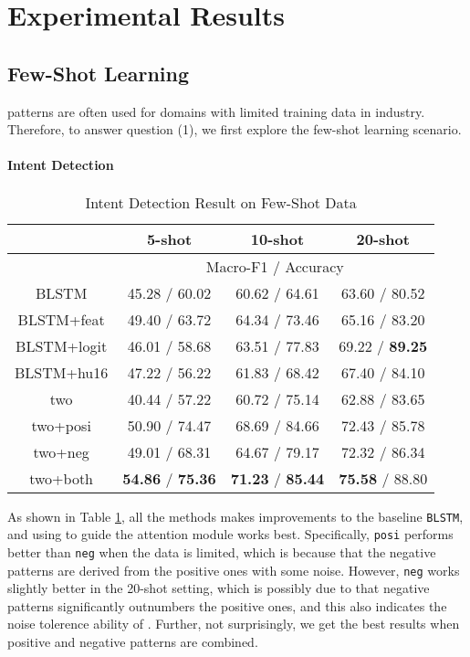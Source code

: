 \section{Experimental Results}
\label{sec:experiments}

\subsection{Few-Shot Learning}
\RE patterns are often used for domains with limited training data in industry. Therefore, to answer question (1), we first explore the few-shot learning scenario.

\paragraph{Intent Detection}

\begin{table}
\setlength{\tabcolsep}{0.23em}
\centering
\small{
\begin{tabular}{|c|c|c|c|}

\hline
  & \multicolumn{1}{|c|}{5-shot} & \multicolumn{1}{|c|}{10-shot} & \multicolumn{1}{|c|}{20-shot}  \\
 \hline
  & \multicolumn{3}{|c|}{Macro-F1 / Accuracy} \\
\hline
BLSTM & 45.28 / 60.02 & 60.62 / 64.61 & 63.60 / 80.52  \\
\hline
BLSTM+feat & 49.40 / 63.72 & 64.34 / 73.46 & 65.16 / 83.20   \\
\hline
BLSTM+logit & 46.01 / 58.68 & 63.51 / 77.83 & 69.22 / \textbf{89.25} \\
\hline
BLSTM+hu16 & 47.22 / 56.22 & 61.83 / 68.42 & 67.40 / 84.10  \\
\hline
two & 40.44 / 57.22 & 60.72 / 75.14 & 62.88 / 83.65  \\
\hline
two+posi & 50.90 / 74.47 & 68.69 / 84.66 & 72.43 / 85.78  \\
\hline
two+neg & 49.01 / 68.31 & 64.67 / 79.17 & 72.32 / 86.34   \\
\hline
two+both & \textbf{54.86} / \textbf{75.36} & \textbf{71.23} / \textbf{85.44} & \textbf{75.58} / 88.80   \\
\hline

\end{tabular}
}
\caption{Intent Detection Result on Few-Shot Data}
\label{tab_intent_few}
\end{table}

As shown in Table \ref{tab_intent_few}, all the methods makes improvements to the baseline \texttt{BLSTM}, and using \RE to guide the attention module works best. Specifically, \texttt{posi} performs better than \texttt{neg} when the data is limited, which is because that the negative patterns are derived from the positive ones with some noise. However, \texttt{neg} works slightly better in the 20-shot setting, which is possibly due to that negative patterns significantly outnumbers the positive ones, and this also indicates the noise tolerence ability of \NN. Further, not surprisingly, we get the best results when positive and negative patterns are combined.


